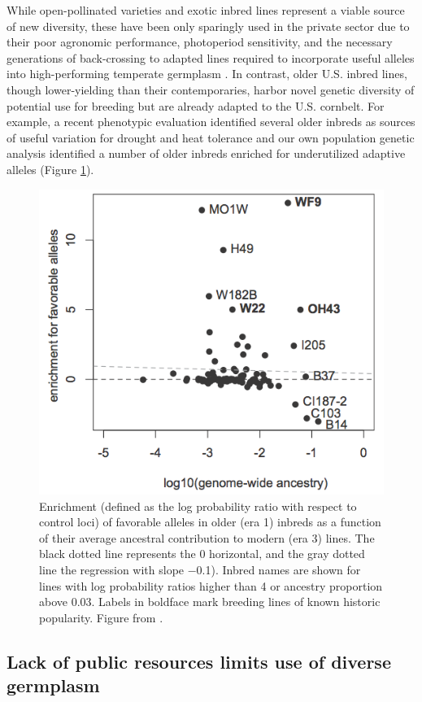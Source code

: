 \documentclass[12pt]{article}
\begin{document}
While open-pollinated varieties and exotic inbred lines represent a viable source of new diversity, these have been only sparingly used in the private sector due to their poor agronomic performance, photoperiod sensitivity, and the necessary generations of back-crossing to adapted lines required to incorporate useful alleles into high-performing temperate germplasm \citep{goodman1999broadening}.
In contrast, older U.S. inbred lines, though lower-yielding than their contemporaries, harbor novel genetic diversity of potential use for breeding but are already adapted to the U.S. cornbelt.  
For example, a recent phenotypic evaluation identified several older inbreds as sources of useful variation for drought and heat tolerance \citep{chen2012characterization} and our own population genetic analysis identified a number of older inbreds enriched for underutilized adaptive alleles (Figure \ref{fig:wf9}).

\begin{figure}
\includegraphics[width=0.5\linewidth]{joost_wf9.png}
\caption{Enrichment (defined as the log probability ratio with respect to control loci) of favorable alleles in older (era 1) inbreds as a function of their average ancestral contribution to modern (era 3) lines. The black dotted line represents the 0 horizontal, and the gray dotted line the regression  with slope −0.1). Inbred names are shown for lines with log probability ratios higher than 4 or ancestry proportion above 0.03. Labels in boldface mark breeding lines of known historic popularity. Figure from \citet{van2012historical}.} 
\label{fig:wf9}
\end{figure}

\subsection*{Lack of public resources limits use of diverse germplasm}
\end{document}
